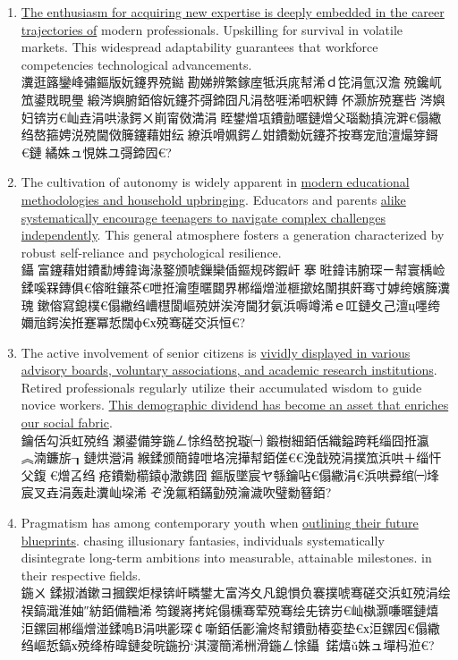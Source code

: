 ﻿\documentclass[lang=cn,11pt]{elegantbook}
\begin{document}
\begin{enumerate}
\item \underline{The enthusiasm for acquiring new expertise is deeply embedded in the career trajectories of} modern professionals. Upskilling  for survival in volatile markets. This widespread adaptability guarantees that workforce competencies  technological advancements.\\瀵逛簬鑾峰彇鏂版妧鑳界殑鐑勘娣辨繁鎵庢牴浜庣幇浠ｄ笓涓氫汉澹殑鑱屼笟鍙戝睍璺緞涔嬩腑銆傛妧鑳芥彁鍗囧凡涓嶅啀浠呬粎鏄伓灏旂殑蹇呰涔嬩妇锛岃€屾垚涓哄湪鍔ㄨ崱甯傚満涓眰鐢熷瓨鐨勯暱鏈熷父瑙勬搷浣溿€傝繖绉嶅箍娉涚殑閫傚簲鑳藉姏纭繚浜嗗姵鍔ㄥ姏鐨勬妧鑳芥按骞宠兘澶熶笌鎶€鏈繘姝ュ悓姝ユ彁鍗囥€?
\item The cultivation of autonomy is widely apparent in \underline{modern educational methodologies and household upbringing}. Educators and parents \underline{alike systematically encourage teenagers to navigate complex challenges independently}. This general atmosphere fosters a generation characterized by robust self-reliance and psychological resilience.\\鑷富鑳藉姏鐨勫煿鍏诲湪鐜颁唬鏁欒偛鏂规硶鍜屽搴暀鍏讳腑琛ㄧ幇寰楀崄鍒嗘槑鏄俱€傛暀鑲茶€呭拰瀹堕暱閮界郴缁熷湴榧撳姳闈掑皯骞寸嫭绔嬪簲瀵瑰鏉傛寫鎴樸€傝繖绉嶆櫘閬嶇殑姘涘洿閫犲氨浜嗕竴浠ｅ叿鏈夊己澶ц嚜绔嬭兘鍔涘拰蹇冪悊闊ф€х殑骞磋交浜恒€?
\item The active involvement of senior citizens is \underline{vividly displayed in various advisory boards, voluntary associations, and academic research institutions}. Retired professionals regularly utilize their accumulated wisdom to guide novice workers. \underline{This demographic dividend has become an asset that enriches our social fabric}.\\鑰佸勾浜虹殑绉瀬鍙備笌鍦ㄥ悇绉嶅挩璇㈠鍛樹細銆佸織鎰跨粍缁囧拰瀛︽湳鐮旂┒鏈烘瀯涓緱鍒颁簡鍏呭垎浣撶幇銆傞€€浼戠殑涓撲笟浜哄＋缁忓父鍑€熷叾绉疮鐨勬櫤鎱ф潵鎸囧鏂版墜宸ヤ綔鑰呫€傝繖涓€浜哄彛绾㈠埄宸叉垚涓轰赴瀵屾垜浠ぞ浼氱粨鏋勭殑瀹濊吹璧勬簮銆?
\item Pragmatism has  among contemporary youth when \underline{outlining their future blueprints}.  chasing illusionary fantasies, individuals systematically disintegrate long-term ambitions into measurable, attainable milestones.  in their respective fields.\\鍦ㄨ鍒掓湭鏉ヨ摑鍥炬椂锛屽疄鐢ㄤ富涔夊凡鎴愪负褰撲唬骞磋交浜虹殑涓绘祦鎬濈淮妯″紡銆備粬浠笉鍐嶈拷姹傝櫄骞荤殑骞绘兂锛岃€屾槸灏嗛暱鏈熺洰鏍囩郴缁熷湴鍒嗚В涓哄彲琛￠噺銆佸彲瀹炵幇鐨勯樁娈垫€х洰鏍囥€傝繖绉嶇悊鎬х殑绛栫暐鏈夋晥鍦扮‘淇濅簡浠栦滑鍦ㄥ悇鑷鍩熺ǔ姝ュ墠杩涖€?

\end{enumerate}
\end{document}
